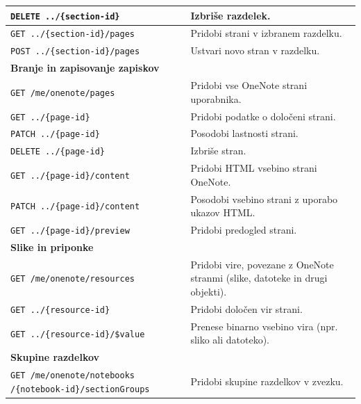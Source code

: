 \documentclass[a4paper, 12pt]{book}
\begin{document}
\begin{longtable}{|p{6cm}|p{8cm}|}
\texttt{DELETE ../\{section-id\}} &
Izbriše razdelek. \\
\hline

\texttt{GET ../\{section-id\}/pages} &
Pridobi strani v izbranem razdelku. \\
\hline

\texttt{POST ../\{section-id\}/pages} &
Ustvari novo stran v razdelku. \\
\hline

\multicolumn{2}{|l|}{\textbf{Branje in zapisovanje zapiskov}} \\
\hline

\texttt{GET /me/onenote/pages} &
Pridobi vse OneNote strani uporabnika. \\
\hline

\texttt{GET ../\{page-id\}} &
Pridobi podatke o določeni strani. \\
\hline

\texttt{PATCH ../\{page-id\}} &
Posodobi lastnosti strani. \\
\hline

\texttt{DELETE ../\{page-id\}} &
Izbriše stran. \\
\hline

\texttt{GET ../\{page-id\}/content} &
Pridobi HTML vsebino strani OneNote. \\
\hline

\texttt{PATCH ../\{page-id\}/content} &
Posodobi vsebino strani z uporabo ukazov HTML. \\
\hline

\texttt{GET ../\{page-id\}/preview} &
Pridobi predogled strani. \\
\hline

\multicolumn{2}{|l|}{\textbf{Slike in priponke}} \\
\hline

\texttt{GET /me/onenote/resources} &
Pridobi vire, povezane z OneNote stranmi (slike, datoteke in drugi objekti). \\
\hline

\texttt{GET ../\{resource-id\}} &
Pridobi določen vir strani. \\
\hline

\texttt{GET ../\{resource-id\}/\$value} &
Prenese binarno vsebino vira (npr. sliko ali datoteko). \\
\hline

\multicolumn{2}{|l|}{\textbf{Skupine razdelkov}} \\
\hline

\texttt{GET /me/onenote/notebooks
/\{notebook-id\}/sectionGroups} &
Pridobi skupine razdelkov v zvezku. \\
\hline


\end{longtable}
\end{document}
